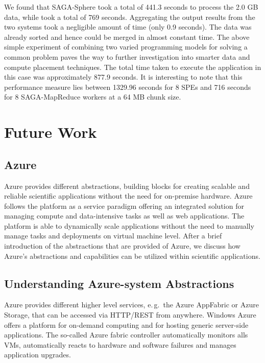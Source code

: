 \documentclass[3p,twocolumn]{elsarticle}
\begin{document}
We found that SAGA-Sphere took a total of 441.3 seconds to process the
2.0 GB data, while \sagamapreduce took a total of 769
seconds. Aggregating the output results from the two systems took a
negligible amount of time (only 0.9 seconds). The data was already
sorted and hence could be merged in almost constant
time. %
The above simple experiment of combining two varied programming models
for solving a common problem paves the way to further investigation
into smarter data and compute placement techniques.  The total time
taken to execute the \wc application in this case was approximately
877.9 seconds. It is interesting to note that this performance measure
lies between 1329.96 seconds for 8 SPEs and 716 seconds for 8
SAGA-MapReduce workers at a 64 MB chunk size.

\section{Future Work}


\subsection{Azure} 

Azure provides different abstractions, building blocks for creating
scalable and reliable scientific applications without the need for
on-premise hardware. Azure follows the platform as a service paradigm
offering an integrated solution for managing compute and
data-intensive tasks as well as web applications. The platform is able
to dynamically scale applications without the need to manually manage
tasks and deployments on virtual machine level. After a brief
introduction of the abstractions that are provided of Azure, we
discuss how Azure's abstractions and capabilities can be utilized
within scientific applications.

\subsection{Understanding Azure-system Abstractions}

Azure provides different higher level services, e.\,g.\ the Azure
AppFabric or Azure Storage, that can be accessed via HTTP/REST from
anywhere. Windows Azure offers a platform for on-demand computing and
for hosting generic server-side applications. The so-called Azure
fabric controller automatically monitors alls VMs, automatically
reacts to hardware and software failures and manages application
upgrades.
\end{document}
